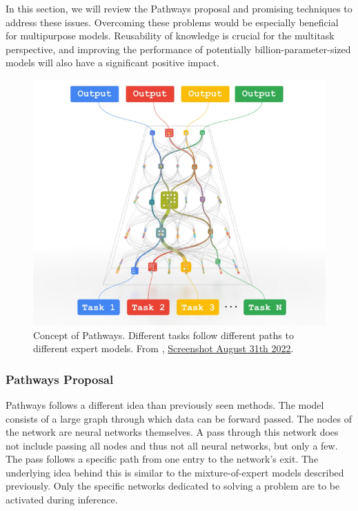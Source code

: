 \documentclass[
]{krantz}
\begin{document}
In this section, we will review the Pathways proposal \citep{Dean21} and promising techniques to address these issues. Overcoming these problems would be especially beneficial for multipurpose
models. Reusability of knowledge is crucial for the multitask perspective, and improving the performance of potentially billion-parameter-sized models will also have a significant positive impact.

\begin{figure}

{\centering \includegraphics[width=0.8\linewidth]{figures/03-03-multipurpose/Pathways} 

}

\caption{Concept of Pathways. Different tasks follow different paths to different expert models. From \citet{Dean21}, \href{https://www.youtube.com/watch?v=Nf-d9CcEZ2w}{Screenshot August 31th 2022}.}\label{fig:pathways}
\end{figure}



\hypertarget{pathways-proposal}{%
\subsubsection{Pathways Proposal}\label{pathways-proposal}}

Pathways \citep{Dean21} follows a different idea than previously seen methods. The model consists of a large graph through which data can be forward passed. The nodes of the network are neural
networks themselves. A pass through this network does not include passing all nodes and thus not all neural networks, but only a few. The pass follows a specific path from one entry to the
network's exit. The underlying idea behind this is similar to the mixture-of-expert models described previously. Only the specific networks dedicated to solving a problem are to be activated during inference.
\end{document}

